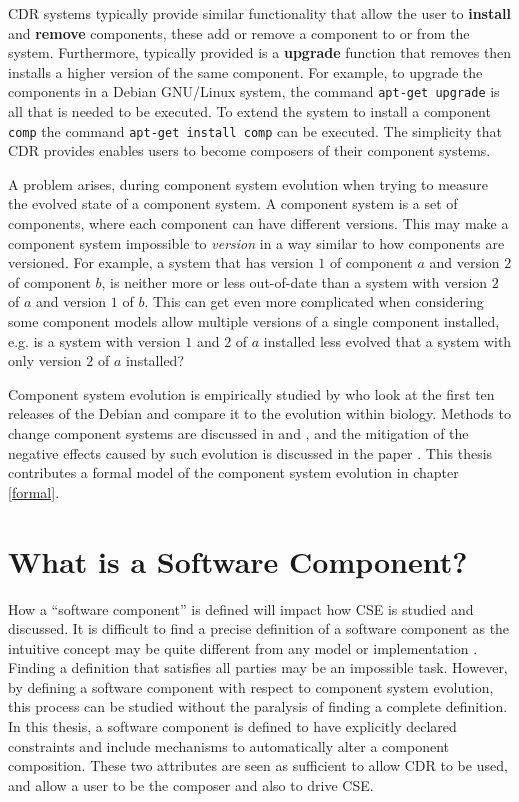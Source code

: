 CDR systems typically provide similar functionality that allow the user to \textbf{install} and \textbf{remove} components, these add or remove a component to or from the system.
Furthermore, typically provided is a \textbf{upgrade} function that removes then installs a higher version of the same component.
For example, to upgrade the components in a Debian GNU/Linux system, the command \texttt{apt-get upgrade} is all that is needed to be executed.
To extend the system to install a component \texttt{comp} the command \texttt{apt-get install comp} can be executed.
The simplicity that CDR provides enables users to become composers of their component systems.

A problem arises, during component system evolution when trying to measure the evolved state of a component system.
A component system is a set of components, where each component can have different versions.
This may make a component system impossible to \textit{version} in a way similar to how components are versioned.
For example, a system that has version $1$ of component $a$ and version $2$ of component $b$, 
is neither more or less out-of-date than a system with version $2$ of $a$ and version $1$ of $b$.
This can get even more complicated when considering some component models allow multiple versions of a single component installed, e.g. 
is a system with version $1$ and $2$ of $a$ installed less evolved that a system with only version $2$ of $a$ installed?

Component system evolution is empirically studied by \cite{fortuna2011} 
who look at the first ten releases of the Debian and compare it to the evolution within biology.
Methods to change component systems are discussed in \citep{Ryan2005} and \citep{Luo2004},
and the mitigation of the negative effects caused by such evolution is discussed in the paper \citep{Stuckenholz2007}.
This thesis contributes a formal model of the component system evolution in chapter \ref{formal}.

\section{What is a Software Component?}
\label{background.components}
How a ``software component'' is defined will impact how CSE is studied and discussed.
It is difficult to find a precise definition of a software component as the intuitive concept may be quite different from any model or implementation \citep{Crnkovic2011}.
Finding a definition that satisfies all parties may be an impossible task.
However, by defining a software component with respect to component system evolution, 
this process can be studied without the paralysis of finding a complete definition.
In this thesis, a software component is defined to have explicitly declared constraints and include mechanisms to automatically alter a component composition.
These two attributes are seen as sufficient to allow CDR to be used, and allow a user to be the composer and also to drive CSE. 


